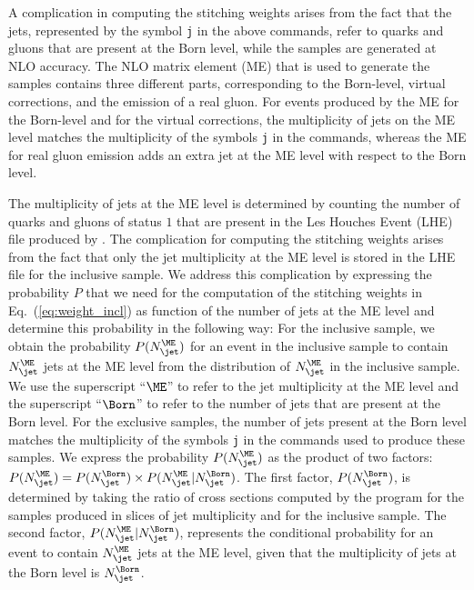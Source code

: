 A complication in computing the stitching weights arises from the fact that the jets, represented by the symbol \texttt{j} in the above commands,
refer to quarks and gluons that are present at the Born level, while the samples are generated at NLO accuracy.
The NLO matrix element (ME) that is used to generate the samples contains three different parts, 
corresponding to the Born-level, virtual corrections, and the emission of a real gluon.
For events produced by the ME for the Born-level and for the virtual corrections,
the multiplicity of jets on the ME level matches the multiplicity of the symbols \texttt{j} in the \MGvATNLO commands,
whereas the ME for real gluon emission adds an extra jet at the ME level with respect to the Born level.

The multiplicity of jets at the ME level is determined by counting the number of quarks and gluons of status $1$ 
that are present in the \textrm{Les Houches Event} (LHE)~\cite{Alwall:2006yp} file produced by \MGvATNLO.
The complication for computing the stitching weights arises from the fact that only the jet multiplicity at the ME level is stored in the LHE file for the inclusive sample.
We address this complication by expressing the probability $P$ that we need for the computation of the stitching weights in Eq.~(\ref{eq:weight_incl})
as function of the number of jets at the ME level and determine this probability in the following way:
For the inclusive sample, we obtain the probability $P(N_{\jet}^{\ME})$ for an event in the inclusive sample
to contain $N_{\jet}^{\ME}$ jets at the ME level 
from the distribution of $N_{\jet}^{\ME}$ in the inclusive sample.
We use the superscript ``$\ME$'' to refer to the jet multiplicity at the ME level
and the superscript ``$\Born$'' to refer to the number of jets that are present at the Born level.
For the exclusive samples, the number of jets present at the Born level matches the multiplicity of the symbols \texttt{j} in the \MGvATNLO commands
used to produce these samples.
We express the probability $P(N_{\jet}^{\ME})$ as the product of two factors: $P(N_{\jet}^{\ME}) = P(N_{\jet}^{\Born}) \times P(N_{\jet}^{\ME} \vert N_{\jet}^{\Born})$.
The first factor, $P(N_{\jet}^{\Born})$, is determined by taking the ratio of cross sections computed by the program \MGvATNLO 
for the samples produced in slices of jet multiplicity and for the inclusive sample.
The second factor, $P(N_{\jet}^{\ME} \vert N_{\jet}^{\Born})$, represents the conditional probability for an event to contain $N_{\jet}^{\ME}$ jets at the ME level,
given that the multiplicity of jets at the Born level is $N_{\jet}^{\Born}$.
